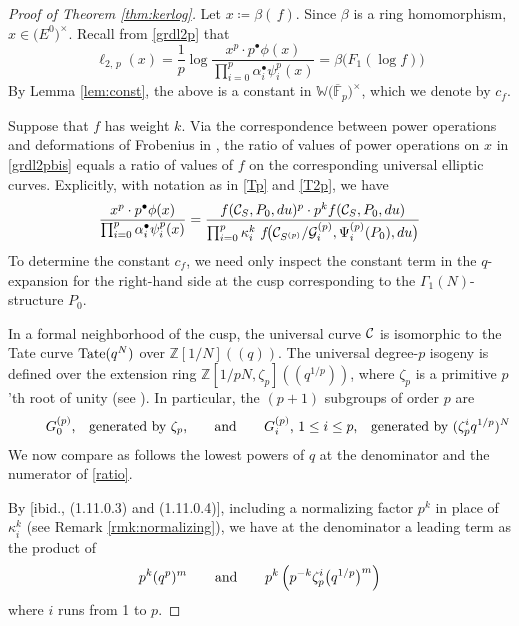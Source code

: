 \documentclass{gtpart}
\theoremstyle{definition}
\theoremstyle{remark}
\newcommand{\mb}[1]{\mathbb{#1}}
\newcommand{\cF}{\overline {\mb F}}
\newcommand{\CC}{{\cal C}}
\newcommand{\CG}{{\cal G}}
\newcommand{\BW}{{\mb W}}
\newcommand{\BZ}{{\mb Z}}
\newcommand{\ad}{{\rm and}}
\newcommand{\A}{\alpha}
\newcommand{\B}{\beta}
\newcommand{\G}{\Gamma}
\newcommand{\K}{\kappa}
\newcommand{\ce}{\coloneqq}
\newcommand{\lp}{(\!(}
\newcommand{\rp}{)\!)}
\renewcommand{\=}{\approx}
\renewcommand{\-}{\sim}
\newcommand{\Tate}{{\rm Tate}}
\numberwithin{equation}{section}
\numberwithin{thm}{section}
\begin{document}
\begin{proof}[Proof of Theorem \ref{thm:kerlog}]
 Let $x \ce \B(\,f)$.  Since $\B$ is a ring homomorphism, $x \in \big( E^0 \big)^{\!\times}$.  
 Recall from \eqref{grdl2p} that 
 \begin{equation}
  \label{grdl2pbis}
  \ell_{2,\,p}(x) = \frac{1}{p} \log \frac{x^p \cdot p^\bullet \phi(x)}{\prod_{i=0}^p \A_i^\bullet \psi^p_i(x)} = \B \big( F_1(\log f) \big) 
 \end{equation}
 By Lemma \ref{lem:const}, the above is a constant in $\BW \big( \cF_p \big)^{\!\times}$, which we denote by $c_f$.  

 Suppose that $f$ has weight $k$.  
 Via the correspondence between power operations and deformations of Frobenius in \cite[Theorem B]{cong}, 
 the ratio of values of power operations on $x$ in \eqref{grdl2pbis} 
 equals a ratio of values of $f$ on the corresponding universal elliptic curves.  
 Explicitly, with notation as in \eqref{Tp} and \eqref{T2p}, we have 
 \begin{equation}
  \label{ratio}
  \frac{x^p \cdot p^\bullet \phi(x)}{\prod_{i=0}^p \A_i^\bullet \psi^p_i(x)} = 
  \frac{f(\CC_S, P_0, du)^p \cdot p^k f(\CC_S, P_0, du)}
  {\prod_{i=0}^p \K_i^k ~ f\!\big(\CC_{S^{(p)}}/\CG^{(p)}_i, \Psi^{(p)}_i(P_0), du\big)} 
 \end{equation}
 To determine the constant $c_f$, we need only inspect the constant term in the $q$-expansion for the right-hand side 
 at the cusp corresponding to the $\G_1(N)$-structure $P_0$.  

 In a formal neighborhood of the cusp, 
 the universal curve $\CC$ is isomorphic to the Tate curve $\Tate(q^N)$ over $\BZ [1/N] \lp q \rp$.  
 The universal degree-$p$ isogeny is defined over the extension ring $\BZ [1/pN, \zeta_p] \lp q^{1/p} \rp$, 
 where $\zeta_p$ is a primitive $p$'th root of unity (see \cite[Sections 1.2, 1.4, and 1.11]{padicprop}).  
 In particular, the $(p + 1)$ subgroups of order $p$ are 
 \[
  \qquad~~ \text{$G^{(p)}_0$,~~~generated by $\zeta_p$,} \qquad \ad \qquad \text{$G^{(p)}_i$, $1 \leq i \leq p$,~~~generated by $(\zeta_p^i q^{1/p})^N$} 
 \]
 We now compare as follows the lowest powers of $q$ at the denominator and the numerator of \eqref{ratio}.  

 By [ibid., (1.11.0.3) and (1.11.0.4)], including a normalizing factor $p^k$ in place of $\K_i^k$ (see Remark \ref{rmk:normalizing}), 
 we have at the denominator a leading term as the product of 
 \[
  p^k (q^p)^m \qquad \ad \qquad p^k \left( p^{-k} \zeta_p^i \big( q^{1/p} \big)^m \right) 
 \]
 where $i$ runs from 1 to $p$.  


\end{proof}
\end{document}

